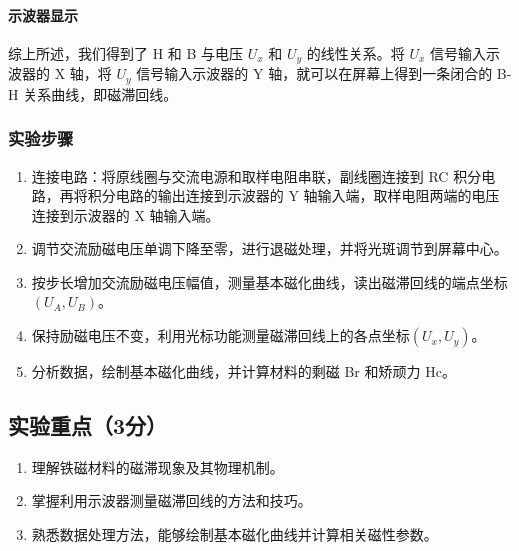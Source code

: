 \documentclass[]{../template/Report}%
\begin{document}
\paragraph{示波器显示}
综上所述，我们得到了 H 和 B 与电压 $U_x$ 和 $U_y$ 的线性关系。将 $U_x$ 信号输入示波器的 X 轴，将 $U_y$ 信号输入示波器的 Y 轴，就可以在屏幕上得到一条闭合的 B-H 关系曲线，即磁滞回线。

\subsubsection{实验步骤}
\begin{enumerate}
    \item 连接电路：将原线圈与交流电源和取样电阻串联，副线圈连接到 RC 积分电路，再将积分电路的输出连接到示波器的 Y 轴输入端，取样电阻两端的电压连接到示波器的 X 轴输入端。
    \item 调节交流励磁电压单调下降至零，进行退磁处理，并将光斑调节到屏幕中心。
    \item 按步长增加交流励磁电压幅值，测量基本磁化曲线，读出磁滞回线的端点坐标$(U_A, U_B)$。
    \item 保持励磁电压不变，利用光标功能测量磁滞回线上的各点坐标$(U_x, U_y)$。
    \item 分析数据，绘制基本磁化曲线，并计算材料的剩磁 Br 和矫顽力 Hc。
\end{enumerate}

\subsection{实验重点（3分）}
\begin{enumerate}
    \item 理解铁磁材料的磁滞现象及其物理机制。
    \item 掌握利用示波器测量磁滞回线的方法和技巧。
    \item 熟悉数据处理方法，能够绘制基本磁化曲线并计算相关磁性参数。
\end{enumerate}
\end{document}
